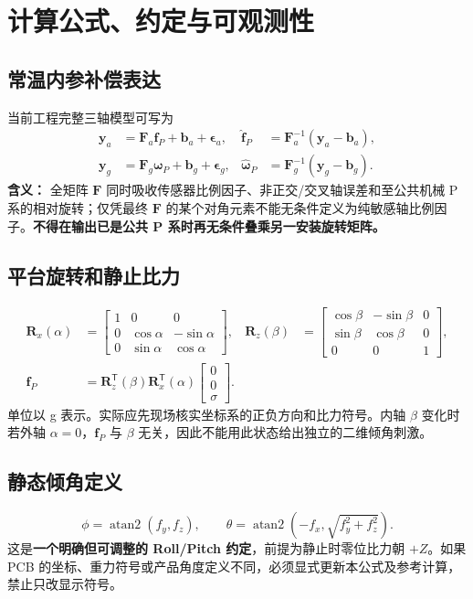 \chapter{计算公式、约定与可观测性}
\section{常温内参补偿表达}
当前工程完整三轴模型可写为
\begin{align}
\bm y_a&=\mathbf F_a\bm f_P+\bm b_a+\bm\epsilon_a,&\hat{\bm f}_P&=\mathbf F_a^{-1}(\bm y_a-\bm b_a),\\
\bm y_g&=\mathbf F_g\bm\omega_P+\bm b_g+\bm\epsilon_g,&\hat{\bm\omega}_P&=\mathbf F_g^{-1}(\bm y_g-\bm b_g).
\end{align}
\textbf{含义：} 全矩阵 $\mathbf F$ 同时吸收传感器比例因子、非正交/交叉轴误差和至公共机械 P 系的相对旋转；仅凭最终 $\mathbf F$ 的某个对角元素不能无条件定义为纯敏感轴比例因子。\textbf{不得在输出已是公共 P 系时再无条件叠乘另一安装旋转矩阵。}

\section{平台旋转和静止比力}
\begin{align}
\mathbf R_x(\alpha)&=\begin{bmatrix}1&0&0\\0&\cos\alpha&-\sin\alpha\\0&\sin\alpha&\cos\alpha\end{bmatrix},&
\mathbf R_z(\beta)&=\begin{bmatrix}\cos\beta&-\sin\beta&0\\\sin\beta&\cos\beta&0\\0&0&1\end{bmatrix},\\
\bm f_P&=\mathbf R_z^{\mathsf T}(\beta)\mathbf R_x^{\mathsf T}(\alpha)\begin{bmatrix}0\\0\\\sigma\end{bmatrix}.
\end{align}
单位以 g 表示。实际应先现场核实坐标系的正负方向和比力符号。内轴 $\beta$ 变化时若外轴 $\alpha=0$，$\bm f_P$ 与 $\beta$ 无关，因此不能用此状态给出独立的二维倾角刺激。
\section{静态倾角定义}
\begin{equation}
\phi=\operatorname{atan2}(f_y,f_z),\qquad
\theta=\operatorname{atan2}\!\left(-f_x,\sqrt{f_y^2+f_z^2}\right).
\label{eq:tilt}
\end{equation}
这是\textbf{一个明确但可调整的 Roll/Pitch 约定}，前提为静止时零位比力朝 $+Z$。如果 PCB 的坐标、重力符号或产品角度定义不同，必须显式更新本公式及参考计算，禁止只改显示符号。
